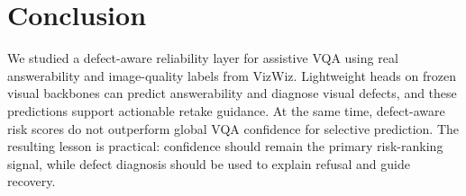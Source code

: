 \section{Conclusion}

We studied a defect-aware reliability layer for assistive VQA using real answerability and image-quality labels from VizWiz. Lightweight heads on frozen visual backbones can predict answerability and diagnose visual defects, and these predictions support actionable retake guidance. At the same time, defect-aware risk scores do not outperform global VQA confidence for selective prediction. The resulting lesson is practical: confidence should remain the primary risk-ranking signal, while defect diagnosis should be used to explain refusal and guide recovery.
